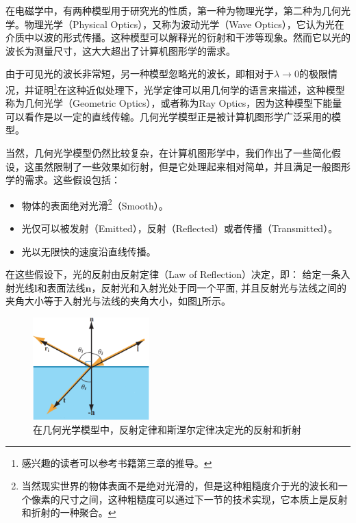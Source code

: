 在电磁学中，有两种模型用于研究光的性质，第一种为物理光学，第二种为几何光学。物理光学（Physical Optics），又称为波动光学（Wave Optics），它认为光在介质中以波的形式传播。这种模型可以解释光的衍射和干涉等现象。然而它以光的波长为测量尺寸，这大大超出了计算机图形学的需求。

由于可见光的波长非常短，另一种模型忽略光的波长，即相对于$\lambda\to 0$的极限情况，并证明\footnote{感兴趣的读者可以参考书籍\cite{b:PrinciplesofOptics}第三章的推导。}在这种近似处理下，光学定律可以用几何学的语言来描述，这种模型称为几何光学（Geometric Optics），或者称为Ray Optics，因为这种模型下能量可以看作是以一定的直线传输。几何光学模型正是被计算机图形学广泛采用的模型。

当然，几何光学模型仍然比较复杂，在计算机图形学中，我们作出了一些简化假设，这虽然限制了一些效果如衍射，但是它处理起来相对简单，并且满足一般图形学的需求。这些假设包括：

\begin{itemize}
	\item 物体的表面绝对光滑\footnote{当然现实世界的物体表面不是绝对光滑的，但是这种粗糙度介于光的波长和一个像素的尺寸之间，这种粗糙度可以通过下一节的技术实现，它本质上是反射和折射的一种聚合。}（Smooth）。
	\item 光仅可以被发射（Emitted），反射（Reflected）或者传播（Transmitted）。
	\item 光以无限快的速度沿直线传播。
\end{itemize} 

在这些假设下，光的反射由反射定律（Law of Reflection）决定，即： 给定一条入射光线$\mathbf{l}$和表面法线$\mathbf{n}$，反射光和入射光处于同一个平面, 并且反射光与法线之间的夹角大小等于入射光与法线的夹角大小，如图\ref{f:intro-Ray-optics-model}所示。

\begin{figure}
\sidecaption
	\includegraphics[width=0.4\textwidth]{graphics/gi/ray-optics-1}
	\caption{在几何光学模型中，反射定律和斯涅尔定律决定光的反射和折射}
	\label{f:intro-Ray-optics-model}
\end{figure}


